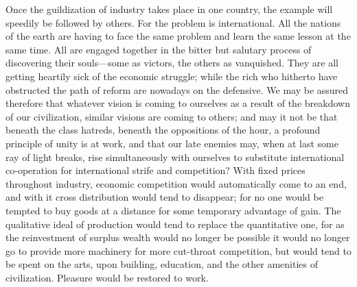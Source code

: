 \documentclass{book}
\begin{document}
Once the guildization of industry takes place in one country, the example will speedily be followed by others. For the problem is international. All the nations of the earth are having to face the same problem and learn the same lesson at the same time. All are engaged together in the bitter but salutary process of discovering their souls—some as victors, the others as vanquished. They are all getting heartily sick of the economic struggle; while the rich who hitherto have obstructed the path of reform are nowadays on the defensive. We may be assured therefore that whatever vision is coming to ourselves as a result of the breakdown of our civilization, similar visions are coming to others; and may it not be that beneath the class hatreds, beneath the oppositions of the hour, a profound principle of unity is at work, and that our late enemies may, when at last some ray of light breaks, rise simultaneously with ourselves to substitute international co-operation for international strife and competition? With fixed prices throughout industry, economic competition would automatically come to an end, and with it cross distribution would tend to disappear; for no one would be tempted to buy goods at a distance for some temporary advantage of gain. The qualitative ideal of production would tend to replace the quantitative one, for as the reinvestment of surplus wealth would no longer be possible it would no longer go to provide more machinery for more cut-throat competition, but would tend to be spent on the arts, upon building, education, and the other amenities of civilization. Pleasure would be restored to work.
\end{document}
